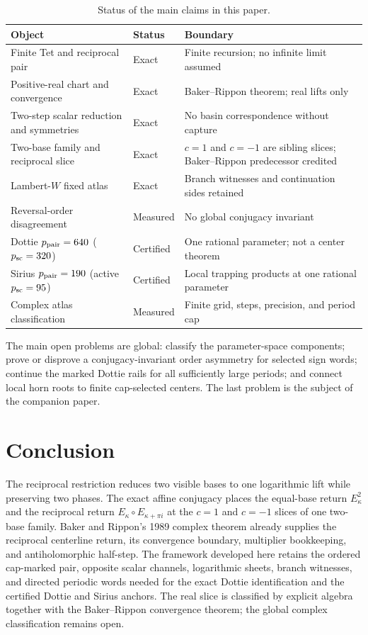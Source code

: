 \documentclass[11pt]{article}
\theoremstyle{definition}
\theoremstyle{remark}
\begin{document}
\begin{table}[H]
\centering
\caption{Status of the main claims in this paper.}
\label{tab:claim-status-p1}
\begin{tabularx}{\textwidth}{@{}l l X@{}}
\toprule
Object & Status & Boundary \\
\midrule
Finite Tet and reciprocal pair & Exact & Finite recursion; no infinite limit assumed \\
Positive-real chart and convergence & Exact & Baker--Rippon theorem; real lifts only \\
Two-step scalar reduction and symmetries & Exact & No basin correspondence without capture \\
Two-base family and reciprocal slice & Exact & $c=1$ and $c=-1$ are sibling slices; Baker--Rippon predecessor credited \\
Lambert-$W$ fixed atlas & Exact & Branch witnesses and continuation sides retained \\
Reversal-order disagreement & Measured & No global conjugacy invariant \\
Dottie $p_{\rm pair}=640$ ($p_{\rm sc}=320$) & Certified & One rational parameter; not a center theorem \\
Sirius $p_{\rm pair}=190$ (active $p_{\rm sc}=95$) & Certified & Local trapping products at one rational parameter \\
Complex atlas classification & Measured & Finite grid, steps, precision, and period cap \\
\bottomrule
\end{tabularx}
\end{table}

The main open problems are global: classify the parameter-space components; prove or disprove a conjugacy-invariant order asymmetry for selected sign words; continue the marked Dottie rails for all sufficiently large periods; and connect local horn roots to finite cap-selected centers.  The last problem is the subject of the companion paper.

\section{Conclusion}

The reciprocal restriction reduces two visible bases to one logarithmic lift while preserving two phases.  The exact affine conjugacy places the equal-base return $E_\kappa^2$ and the reciprocal return $E_\kappa\circ E_{\kappa+\pi i}$ at the $c=1$ and $c=-1$ slices of one two-base family.  Baker and Rippon's 1989 complex theorem already supplies the reciprocal centerline return, its convergence boundary, multiplier bookkeeping, and antiholomorphic half-step.  The framework developed here retains the ordered cap-marked pair, opposite scalar channels, logarithmic sheets, branch witnesses, and directed periodic words needed for the exact Dottie identification and the certified Dottie and Sirius anchors.  The real slice is classified by explicit algebra together with the Baker--Rippon convergence theorem; the global complex classification remains open.



\end{document}
